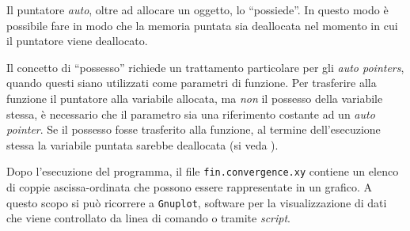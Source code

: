 \lstset{basicstyle=\scriptsize\sf}

\lstset{basicstyle=\sf}

Il puntatore \emph{auto}, oltre ad allocare un oggetto,
lo ``possiede''. In questo modo \`e possibile fare in modo che la
memoria puntata sia deallocata nel momento in cui il puntatore viene deallocato.

Il concetto di ``possesso'' richiede un trattamento particolare per
gli \emph{auto pointers}, quando questi siano utilizzati come
parametri di funzione. Per trasferire alla funzione il puntatore alla
variabile allocata, ma \emph{non} il possesso della variabile stessa,
\`e necessario che il parametro sia una riferimento costante ad un
\emph{auto pointer}. Se il possesso fosse trasferito alla funzione,
al termine dell'esecuzione stessa la variabile puntata sarebbe
deallocata (si veda \cite{Josuttis}).

Dopo l'esecuzione del programma, il file \texttt{fin.convergence.xy}
contiene un elenco di coppie ascissa-ordinata che possono essere
rappresentate in un grafico. A questo scopo si pu\`o ricorrere a
\texttt{Gnuplot}, software per la visualizzazione di dati che viene
controllato da linea di comando o tramite \emph{script}.

\lstset{basicstyle=\scriptsize\sf}

\lstset{basicstyle=\sf}

